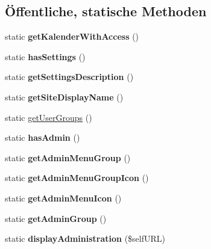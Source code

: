 \subsection*{Öffentliche, statische Methoden}
\begin{DoxyCompactItemize}
\item 
\mbox{\label{classext_kalender_a7cafe64db13b8d49a6625ce6b121f661}} 
static {\bfseries get\+Kalender\+With\+Access} ()
\item 
\mbox{\label{classext_kalender_a00f7f8bb6898eede89393337c914b44f}} 
static {\bfseries has\+Settings} ()
\item 
\mbox{\label{classext_kalender_a7bc1d1633bbe99f5808d7a596c6b68fb}} 
static {\bfseries get\+Settings\+Description} ()
\item 
\mbox{\label{classext_kalender_ad7911410392b0c70c2ca1165866f7d1a}} 
static {\bfseries get\+Site\+Display\+Name} ()
\item 
static \mbox{\hyperlink{classext_kalender_a18a7d3f0607a8da891818017d037e4ae}{get\+User\+Groups}} ()
\item 
\mbox{\label{classext_kalender_a1e35b8ccc4f078a66dc261baab17ed18}} 
static {\bfseries has\+Admin} ()
\item 
\mbox{\label{classext_kalender_a37b15959ea77ef7706203ec53d31bc82}} 
static {\bfseries get\+Admin\+Menu\+Group} ()
\item 
\mbox{\label{classext_kalender_a9f5c231277a97cf09a13cb262d6dd15b}} 
static {\bfseries get\+Admin\+Menu\+Group\+Icon} ()
\item 
\mbox{\label{classext_kalender_a8f0f4a667a97b984140f6ce6757d3616}} 
static {\bfseries get\+Admin\+Menu\+Icon} ()
\item 
\mbox{\label{classext_kalender_ad657d1aab5e92dce00e0aa5e4eff0767}} 
static {\bfseries get\+Admin\+Group} ()
\item 
\mbox{\label{classext_kalender_ad69a7bbc72852078be9bfa500915d13e}} 
static {\bfseries display\+Administration} (\$self\+U\+RL)
\end{DoxyCompactItemize}
